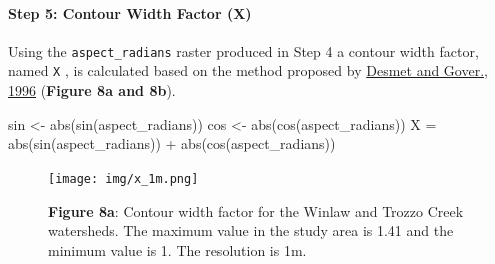 \documentclass[
]{article}
\newenvironment{Shaded}{\begin{snugshade}}{\end{snugshade}}
\newcommand{\FunctionTok}[1]{\textcolor[rgb]{0.00,0.00,0.00}{#1}}
\newcommand{\NormalTok}[1]{#1}
\newcommand{\OtherTok}[1]{\textcolor[rgb]{0.56,0.35,0.01}{#1}}
\newcommand{\SpecialCharTok}[1]{\textcolor[rgb]{0.00,0.00,0.00}{#1}}
\begin{document}
\hypertarget{sec-step-5-ls}{%
\paragraph*{Step 5: Contour Width Factor (X)}\label{sec-step-5-ls}}

Using the \texttt{aspect\_radians} raster produced in Step 4 a contour width factor, named \texttt{X} , is calculated based on the method proposed by \href{https://www.researchgate.net/publication/233425999_A_GIS_procedure_for_automatically_calculating_the_USLE_LS_factor_on_topographically_complex_landscape_units}{Desmet and Gover., 1996} (\textbf{Figure 8a and 8b}).

\begin{Shaded}
\begin{Highlighting}[]
\NormalTok{sin }\OtherTok{\textless{}{-}} \FunctionTok{abs}\NormalTok{(}\FunctionTok{sin}\NormalTok{(aspect\_radians))}
\NormalTok{cos }\OtherTok{\textless{}{-}} \FunctionTok{abs}\NormalTok{(}\FunctionTok{cos}\NormalTok{(aspect\_radians))}
\NormalTok{X }\OtherTok{=} \FunctionTok{abs}\NormalTok{(}\FunctionTok{sin}\NormalTok{(aspect\_radians)) }\SpecialCharTok{+} \FunctionTok{abs}\NormalTok{(}\FunctionTok{cos}\NormalTok{(aspect\_radians))}
\end{Highlighting}
\end{Shaded}

\begin{figure}
\centering
\texttt{[image: img/x\_1m.png]}
\caption{\textbf{Figure 8a}: Contour width factor for the Winlaw and Trozzo Creek watersheds. The maximum value in the study area is 1.41 and the minimum value is 1. The resolution is 1m.}
\end{figure}
\end{document}
